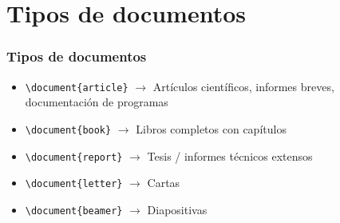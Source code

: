 \section{Tipos de documentos}

\begin{frame}[fragile]
\frametitle{Tipos de documentos}

\begin{itemize}
 \item \verb|\document{article}| $\rightarrow$ Artículos científicos, informes breves, documentación de programas
 \item \verb|\document{book}| $\rightarrow$ Libros completos con capítulos
 \item \verb|\document{report}| $\rightarrow$ Tesis / informes técnicos extensos
 \item \verb|\document{letter}| $\rightarrow$ Cartas
 \item \verb|\document{beamer}| $\rightarrow$ Diapositivas 

\end{itemize}

\end{frame}
